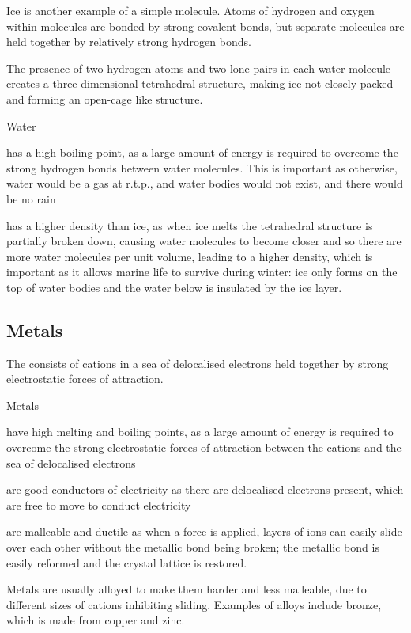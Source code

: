 \documentclass[Chemistry.tex]{subfiles}
\begin{document}
Ice is another example of a simple molecule. Atoms of hydrogen and oxygen within molecules are bonded by strong covalent bonds, but separate molecules are held together by relatively strong hydrogen bonds.

The presence of two hydrogen atoms and two lone pairs in each water molecule creates a three dimensional tetrahedral structure, making ice not closely packed and forming an open-cage like structure.

Water \begin{slinenum}
\item has a high boiling point, as a large amount of energy is required to overcome the strong hydrogen bonds between water molecules. This is important as otherwise, water would be a gas at r.t.p., and water bodies would not exist, and there would be no rain
\item has a higher density than ice, as when ice melts the tetrahedral structure is partially broken down, causing water molecules to become closer and so there are more water molecules per unit volume, leading to a higher density, which is important as it allows marine life to survive during winter: ice only forms on the top of water bodies and the water below is insulated by the ice layer.
\end{slinenum}
\subsection{Metals}
The  consists of cations in a sea of delocalised electrons held together by strong electrostatic forces of attraction.

Metals \begin{slinenum}
\item have high melting and boiling points, as a large amount of energy is required to overcome the strong electrostatic forces of attraction between the cations and the sea of delocalised electrons
\item are good conductors of electricity as there are delocalised electrons present, which are free to move to conduct electricity
\item are malleable and ductile as when a force is applied, layers of ions can easily slide over each other without the metallic bond being broken; the metallic bond is easily reformed and the crystal lattice is restored.\end{slinenum}

Metals are usually alloyed to make them harder and less malleable, due to different sizes of cations inhibiting sliding. Examples of alloys include bronze, which is made from copper and zinc.
\end{document}
